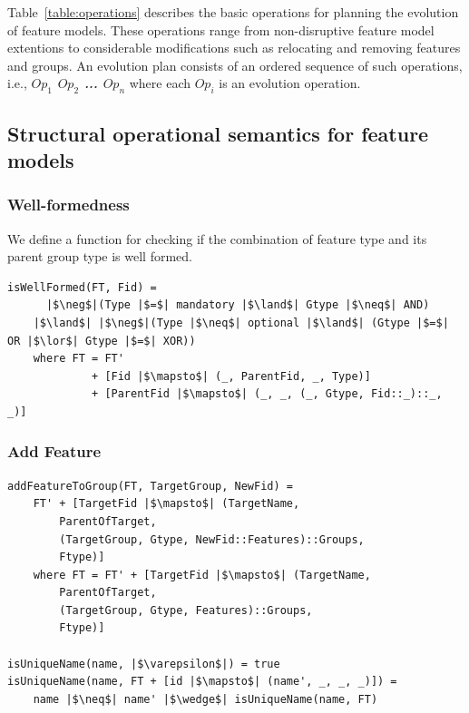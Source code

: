 \documentclass[a4paper,english]{ifimaster}
\begin{document}
Table~\vref{table:operations} describes the basic operations for planning the evolution of feature models. These operations range from non-disruptive feature model extentions to considerable modifications such as relocating and removing features and groups. An evolution plan consists of an ordered sequence of such operations, i.e., \textit{\textbf{$Op_1$ $Op_2$ ... $Op_n$}} where each $Op_i$ is an evolution operation. 

\subsection{Structural operational semantics for feature models}
\label{sub:structural-operational-semantics-for-feature-models}
\subsubsection*{Well-formedness}
We define a function for checking if the combination of feature type and its parent group type is well formed. 

\begin{verbatim}
isWellFormed(FT, Fid) =
      |$\neg$|(Type |$=$| mandatory |$\land$| Gtype |$\neq$| AND)
    |$\land$| |$\neg$|(Type |$\neq$| optional |$\land$| (Gtype |$=$| OR |$\lor$| Gtype |$=$| XOR))
    where FT = FT' 
             + [Fid |$\mapsto$| (_, ParentFid, _, Type)]
             + [ParentFid |$\mapsto$| (_, _, (_, Gtype, Fid::_)::_, _)]
\end{verbatim}

\subsubsection*{Add Feature}

\begin{verbatim}
addFeatureToGroup(FT, TargetGroup, NewFid) =
    FT' + [TargetFid |$\mapsto$| (TargetName,
        ParentOfTarget,
        (TargetGroup, Gtype, NewFid::Features)::Groups,
        Ftype)]
    where FT = FT' + [TargetFid |$\mapsto$| (TargetName,
        ParentOfTarget, 
        (TargetGroup, Gtype, Features)::Groups,
        Ftype)]

isUniqueName(name, |$\varepsilon$|) = true
isUniqueName(name, FT + [id |$\mapsto$| (name', _, _, _)]) = 
    name |$\neq$| name' |$\wedge$| isUniqueName(name, FT)
\end{verbatim}
\end{document}
